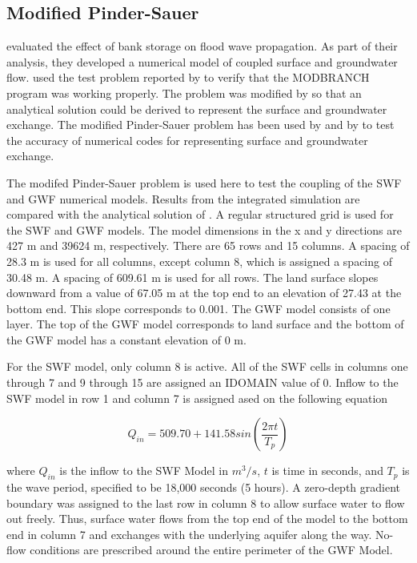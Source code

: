 \documentclass[fleqn]{article}
\begin{document}
\subsection{Modified Pinder-Sauer}
\cite{pindersauer1971} evaluated the effect of bank storage on flood wave propagation.  As part of their analysis, they developed a numerical model of coupled surface and groundwater flow.  \cite{swainwexler1996} used the test problem reported by \cite{pindersauer1971} to verify that the MODBRANCH program was working properly.  The \cite{pindersauer1971} problem was modified by \cite{lal2001} so that an analytical solution could be derived to represent the surface and groundwater exchange.  The modified Pinder-Sauer problem has been used by \cite{lal2001} and by \cite{hughes2015} to test the accuracy of numerical codes for representing surface and groundwater exchange.  

The modifed Pinder-Sauer problem is used here to test the coupling of the SWF and GWF numerical models.  Results from the integrated simulation are compared with the analytical solution of \cite{lal2001}.  A regular structured grid is used for the SWF and GWF models.  The model dimensions in the x and y directions are 427 m and 39624 m, respectively.  There are 65 rows and 15 columns.  A spacing of 28.3 m is used for all columns, except column 8, which is assigned a spacing of 30.48 m.  A spacing of 609.61 m is used for all rows.  The land surface slopes downward from a value of 67.05 m at the top end to an elevation of 27.43 at the bottom end.  This slope corresponds to 0.001.  The GWF model consists of one layer.  The top of the GWF model corresponds to land surface and the bottom of the GWF model has a constant elevation of 0 m.

For the SWF model, only column 8 is active.  All of the SWF cells in columns one through 7 and 9 through 15 are assigned an IDOMAIN value of 0.  Inflow to the SWF model in row 1 and column 7 is assigned ased on the following equation

\begin{equation}
  Q_{in} = 509.70 + 141.58 sin \left ( \frac{2 \pi t}{T_p} \right )
\end{equation}

\noindent where $Q_{in}$ is the inflow to the SWF Model in $m^3/s$, $t$ is time in seconds, and $T_p$ is the wave period, specified to be 18,000 seconds (5 hours).  A zero-depth gradient boundary was assigned to the last row in column 8 to allow surface water to flow out freely.  Thus, surface water flows from the top end of the model to the bottom end in column 7 and exchanges with the underlying aquifer along the way.  No-flow conditions are prescribed around the entire perimeter of the GWF Model.
\end{document}
